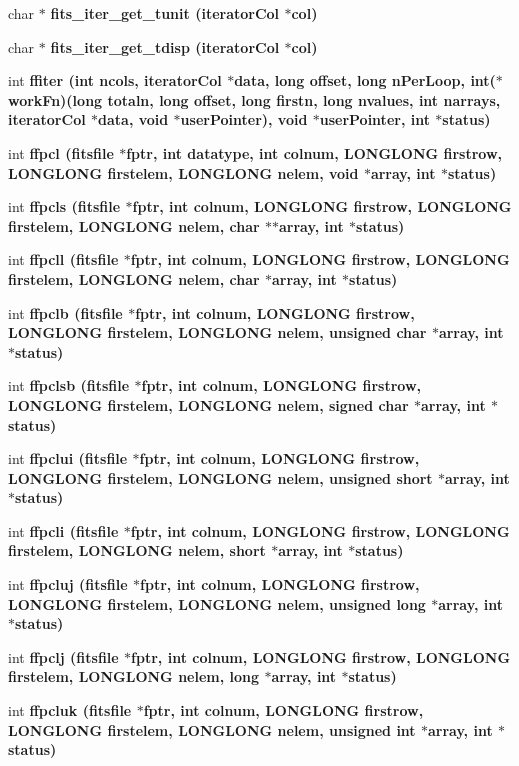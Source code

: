 \begin{CompactItemize}
\item 
char $\ast$ \bf{fits\_\-iter\_\-get\_\-tunit} (\bf{iterator\-Col} $\ast$col)
\item 
char $\ast$ \bf{fits\_\-iter\_\-get\_\-tdisp} (\bf{iterator\-Col} $\ast$col)
\item 
int \bf{ffiter} (int ncols, \bf{iterator\-Col} $\ast$data, long offset, long n\-Per\-Loop, int($\ast$work\-Fn)(long totaln, long offset, long firstn, long nvalues, int narrays, \bf{iterator\-Col} $\ast$data, void $\ast$user\-Pointer), void $\ast$user\-Pointer, int $\ast$status)
\item 
int \bf{ffpcl} (\bf{fitsfile} $\ast$fptr, int \bf{datatype}, int colnum, \bf{LONGLONG} firstrow, \bf{LONGLONG} firstelem, \bf{LONGLONG} nelem, void $\ast$array, int $\ast$status)
\item 
int \bf{ffpcls} (\bf{fitsfile} $\ast$fptr, int colnum, \bf{LONGLONG} firstrow, \bf{LONGLONG} firstelem, \bf{LONGLONG} nelem, char $\ast$$\ast$array, int $\ast$status)
\item 
int \bf{ffpcll} (\bf{fitsfile} $\ast$fptr, int colnum, \bf{LONGLONG} firstrow, \bf{LONGLONG} firstelem, \bf{LONGLONG} nelem, char $\ast$array, int $\ast$status)
\item 
int \bf{ffpclb} (\bf{fitsfile} $\ast$fptr, int colnum, \bf{LONGLONG} firstrow, \bf{LONGLONG} firstelem, \bf{LONGLONG} nelem, unsigned char $\ast$array, int $\ast$status)
\item 
int \bf{ffpclsb} (\bf{fitsfile} $\ast$fptr, int colnum, \bf{LONGLONG} firstrow, \bf{LONGLONG} firstelem, \bf{LONGLONG} nelem, signed char $\ast$array, int $\ast$status)
\item 
int \bf{ffpclui} (\bf{fitsfile} $\ast$fptr, int colnum, \bf{LONGLONG} firstrow, \bf{LONGLONG} firstelem, \bf{LONGLONG} nelem, unsigned short $\ast$array, int $\ast$status)
\item 
int \bf{ffpcli} (\bf{fitsfile} $\ast$fptr, int colnum, \bf{LONGLONG} firstrow, \bf{LONGLONG} firstelem, \bf{LONGLONG} nelem, short $\ast$array, int $\ast$status)
\item 
int \bf{ffpcluj} (\bf{fitsfile} $\ast$fptr, int colnum, \bf{LONGLONG} firstrow, \bf{LONGLONG} firstelem, \bf{LONGLONG} nelem, unsigned long $\ast$array, int $\ast$status)
\item 
int \bf{ffpclj} (\bf{fitsfile} $\ast$fptr, int colnum, \bf{LONGLONG} firstrow, \bf{LONGLONG} firstelem, \bf{LONGLONG} nelem, long $\ast$array, int $\ast$status)
\item 
int \bf{ffpcluk} (\bf{fitsfile} $\ast$fptr, int colnum, \bf{LONGLONG} firstrow, \bf{LONGLONG} firstelem, \bf{LONGLONG} nelem, unsigned int $\ast$array, int $\ast$status)
$$
\end{CompactItemize}
